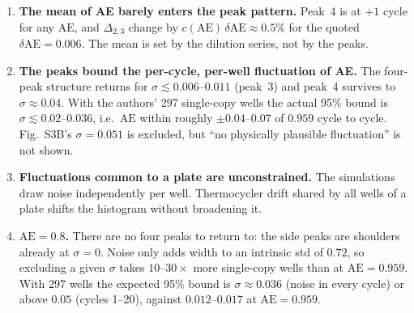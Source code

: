 \documentclass[11pt]{article}
\newcommand{\AEf}{\mathrm{AE}}
\begin{document}
\begin{enumerate}
    \item \textbf{The mean of AE barely enters the peak pattern.} Peak~4 is at $+1$ cycle for
          any $\AEf$, and $\Delta_{2,3}$ change by $c(\AEf)\,\delta\AEf\approx0.5\%$ for the quoted
          $\delta\AEf=0.006$. The mean is set by the dilution series, not by the peaks.
    \item \textbf{The peaks bound the per-cycle, per-well fluctuation of AE.} The four-peak
          structure returns for $\sigma\lesssim0.006$--$0.011$ (peak~3) and peak~4 survives to
          $\sigma\approx0.04$. With the authors' 297 single-copy wells the actual 95\% bound is
          $\sigma\lesssim0.02$--$0.036$, i.e.\ $\AEf$ within roughly $\pm0.04$--$0.07$ of
          $0.959$ cycle to cycle. Fig.~S3B's $\sigma=0.051$ is excluded, but ``no physically
          plausible fluctuation'' is not shown.
    \item \textbf{Fluctuations common to a plate are unconstrained.} The simulations draw noise
          independently per well. Thermocycler drift shared by all wells of a plate shifts the
          histogram without broadening it.
    \item \textbf{$\AEf=0.8$.} There are no four peaks to return to: the side peaks are
          shoulders already at $\sigma=0$. Noise only adds width to an intrinsic std of
          $0.72$, so excluding a given $\sigma$ takes $10$--$30\times$ more single-copy wells
          than at $\AEf=0.959$. With 297 wells the expected 95\% bound is $\sigma\approx0.036$
          (noise in every cycle) or above $0.05$ (cycles 1--20), against $0.012$--$0.017$ at
          $\AEf=0.959$.
\end{enumerate}
\end{document}
